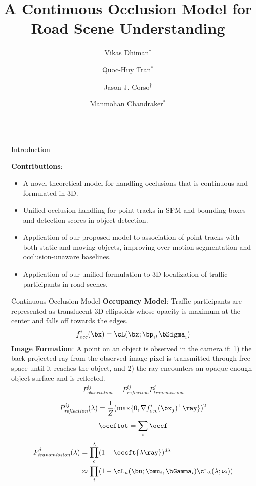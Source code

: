 \documentclass[handout,final]{beamer}
\title{A Continuous Occlusion Model for Road Scene Understanding}
\author{Vikas Dhiman$^\dagger$ \and Quoc-Huy Tran$^*$ \and Jason J. Corso$^\dagger$ \and Manmohan Chandraker$^*$}
\institute{$^\dagger$University of Michigan, Ann Arbor, MI \qquad $^*$NEC Laboratories America, Cupertino, CA}
\newcommand{\meandepth}[1]{\nu_#1}
\newlength{\sepwid}
\newlength{\onecolwid}
\begin{document}
\begin{frame}[t]
  \begin{columns}[t]												%
    \begin{column}{\sepwid}\end{column}			%
    \begin{column}{\onecolwid}
      \begin{block}{Introduction}
        \begin{figure}[!!t]
          
        \end{figure}
        \textbf{Contributions}:
        \begin{itemize}
		  \item A novel theoretical model for handling occlusions that is continuous and formulated in 3D.
		  \item Unified occlusion handling for point tracks in SFM and bounding boxes and detection scores in object detection.
		  \item Application of our proposed model to association of point tracks with both static and moving objects, improving over motion segmentation and occlusion-unaware baselines.
		  \item Application of our unified formulation to 3D localization of traffic participants in road scenes.
		\end{itemize}
      \end{block}

      \begin{block}{Continuous Occlusion Model}
		\textbf{Occupancy Model}: Traffic participants are represented as translucent 3D ellipsoids whose opacity is maximum at the center and falls off towards the edges.
        \begin{align}
          f^i_{\textit{occ}}(\bx) = \cL(\bx; \bp_i, \bSigma_i)
        \end{align}
		\textbf{Image Formation}: A point on an object is observed in the camera if: 1) the back-projected ray from the observed image pixel is transmitted through free space until it reaches the object, and 2) the ray encounters an opaque enough object surface and is reflected.		
        \begin{align}
          P^{ij}_{\textit{observation}} = P^{ij}_{\textit{reflection}}P^{j}_{\textit{transmission}}
        \end{align}
        \begin{align}
          P^{ij}_{\textit{reflection}}(\lambda) = \frac{1}{Z}(\max \{0, \nabla {f^i_{occ}}(\bx_j)^\top \ray \})^2
        \end{align}
        \begin{align}
	        \occftot = \sum_i \occf      
        \end{align}
        \begin{align}
          P^{j}_{\textit{transmission}}(\lambda) &= \prod_{c}^{\lambda} (1 - \occft{\lambda \ray})^{d\lambda}\\
          &\approx \prod_i (1 - \cL_u (\bu; \bmu_i, \bGamma_i) \cL_{\lambda}(\lambda; \meandepth{i}))
        \end{align}


\end{block}
\end{column}
\end{columns}
\end{frame}
\end{document}
